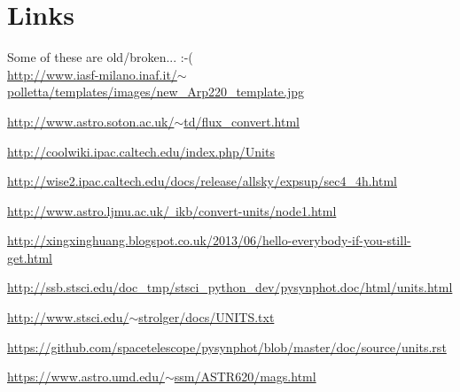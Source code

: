 \documentclass[11pt,a4paper]{article}
\begin{document}
\section{Links}
Some of these are old/broken... :-( \\

\noindent
[1] \href{http://www.iasf-milano.inaf.it/$\sim$polletta/templates/images/new\_Arp220\_template.jpg}{http://www.iasf-milano.inaf.it/$\sim$polletta/templates/images/new\_Arp220\_template.jpg}

\noindent
[2] \href{http://www.astro.soton.ac.uk/$\sim$td/flux\_convert.html}{http://www.astro.soton.ac.uk/$\sim$td/flux\_convert.html}

\noindent
[3] \href{http://coolwiki.ipac.caltech.edu/index.php/Units}{http://coolwiki.ipac.caltech.edu/index.php/Units}

\noindent
[4] \href{http://wise2.ipac.caltech.edu/docs/release/allsky/expsup/sec4\_4h.html}{http://wise2.ipac.caltech.edu/docs/release/allsky/expsup/sec4\_4h.html}

\noindent
[5] \href{http://www.astro.ljmu.ac.uk/~ikb/convert-units/node1.html}{http://www.astro.ljmu.ac.uk/~ikb/convert-units/node1.html}

\noindent
[6] \href{http://xingxinghuang.blogspot.co.uk/2013/06/hello-everybody-if-you-still-get.html}{http://xingxinghuang.blogspot.co.uk/2013/06/hello-everybody-if-you-still-get.html}

\noindent
\href{http://ssb.stsci.edu/doc_tmp/stsci_python_dev/pysynphot.doc/html/units.html}{http://ssb.stsci.edu/doc\_tmp/stsci\_python\_dev/pysynphot.doc/html/units.html}

\noindent
\href{http://www.stsci.edu/~strolger/docs/UNITS.txt}{http://www.stsci.edu/$\sim$strolger/docs/UNITS.txt}

\noindent
\href{https://github.com/spacetelescope/pysynphot/blob/master/doc/source/units.rst}{https://github.com/spacetelescope/pysynphot/blob/master/doc/source/units.rst}

\noindent
\href{https://www.astro.umd.edu/~ssm/ASTR620/mags.html}{https://www.astro.umd.edu/$\sim$ssm/ASTR620/mags.html}




%

\end{document}
